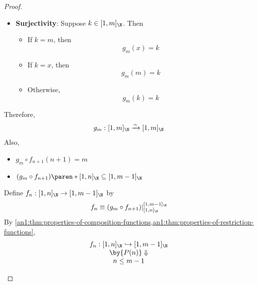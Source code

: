 \begin{proof}
\begin{enumerate}[label=\textbf{(\Alph*)}]
\begin{itemize}
\begin{itemize}
\begin{itemize}
\[\begin{array}{c}
                                      \Downarrow                                                   \\
                                      y_{2} = y_{1}
                                    \end{array}
                                  \]
                          \end{itemize}
                    \item \textbf{Surjectivity}: Suppose $k \in [1, m]_{\N}$. Then
                          \begin{itemize}
                            \item If $k = m$, then
                                  \[
                                    g_{m}(x) = k
                                  \]
                            \item If $k = x$, then
                                  \[
                                    g_{m}(m) = k
                                  \]
                            \item Otherwise,
                                  \[
                                    g_{m}(k) = k
                                  \]
                          \end{itemize}
                  \end{itemize}
                  Therefore,
                  \[
                    g_{m}: [1, m]_{\N} \xrightarrow{\sim} [1, m]_{\N}
                  \]
                  Also,
                  \begin{itemize}
                    \item $g_{m} \circ f_{n + 1}(n + 1) = m$
                    \item $(g_{m} \circ f_{n + 1})\paren*{[1, n]_{\N}} \subseteq [1, m - 1]_{\N}$
                  \end{itemize}
                  Define $f_{n}: [1, n]_{\N} \to [1, m - 1]_{\N}$ by
                  \[
                    f_{n} \equiv (g_{m} \circ f_{n + 1})|_{[1, n]_{\N}}^{[1, m - 1]_{\N}}
                  \]
                  By \cref{an1:thm:properties-of-composition-functions,an1:thm:properties-of-restriction-functions},
                  \[
                    \begin{array}{c}
                      f_{n}: [1, n]_{\N} \hookrightarrow [1, m - 1]_{\N} \\
                      \by{\ensuremath{P(n)}} \Downarrow                  \\
                      n \leq m - 1                                       \\

\end{array}\]
\end{itemize}
\end{enumerate}
\end{proof}
